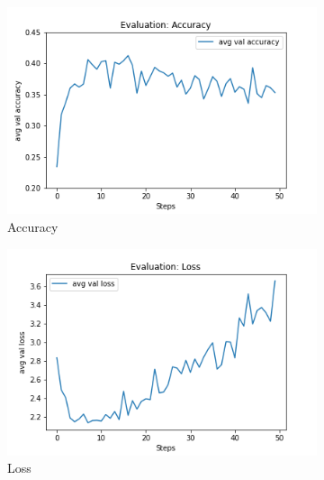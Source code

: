 \begin{figure}[h]
     \centering
     \begin{subfigure}[b]{0.3\textwidth}
         \centering
         \includegraphics[width=\textwidth]{./figure/results/look_around/eval/avg val accuracy.png}
         \caption{Accuracy}
         \label{fig:la_e_accuracy}
     \end{subfigure}
     \hfill
     \begin{subfigure}[b]{0.3\textwidth}
         \centering
         \includegraphics[width=\textwidth]{./figure/results/look_around/eval/avg val loss.png}
         \caption{Loss}
         \label{fig:la_e_loss}
     \end{subfigure}
     \hfill
     \begin{subfigure}[b]{0.3\textwidth}
         \centering

\end{subfigure}
\end{figure}
